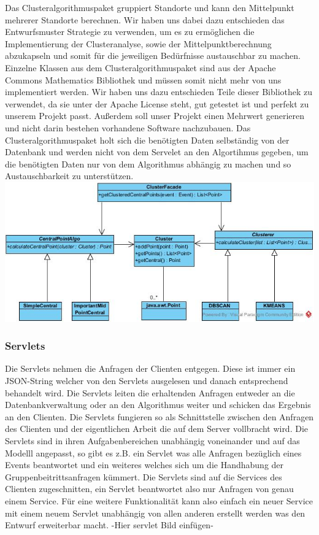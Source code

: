 Das Clusteralgorithmuspaket gruppiert Standorte und kann den Mittelpunkt mehrerer Standorte berechnen. Wir haben uns dabei dazu entschieden das Entwurfsmuster Strategie zu verwenden, um es zu ermöglichen die Implementierung der Clusteranalyse, sowie der Mittelpunktberechnung abzukapseln und somit für die jeweiligen Bedürfnisse austauschbar zu machen. Einzelne Klassen aus dem Clusteralgorithmuspaket sind aus der Apache Commons Mathematics Bibliothek und müssen somit nicht mehr von uns implementiert werden. Wir haben uns dazu entschieden Teile dieser Bibliothek zu verwendet, da sie unter der Apache License steht, gut getestet ist und perfekt zu unserem Projekt passt. Außerdem soll unser Projekt einen Mehrwert generieren und nicht darin bestehen vorhandene Software nachzubauen. Das Clusteralgorithmuspaket holt sich die benötigten Daten selbständig von der Datenbank und werden nicht von dem Servelet an den Algortihmus gegeben, um die benötigten Daten nur von dem Algorithmus abhängig zu machen und so Austauschbarkeit zu unterstützen. 
  \newline
	\includegraphics[width=1\textwidth]{AlgorithmClassDiagram.jpg}

	\subsubsection{Servlets}
	Die Servlets nehmen die Anfragen der Clienten entgegen. Diese ist immer ein JSON-String welcher von den Servlets ausgelesen und danach entsprechend behandelt wird. Die Servlets leiten die erhaltenden Anfragen entweder an die Datenbankverwaltung oder an den Algorithmus weiter und schicken das Ergebnis an den Clienten.
Die Servlets fungieren so als Schnittstelle zwischen den Anfragen des Clienten und der eigentlichen Arbeit die auf dem Server vollbracht wird. 
Die Servlets sind in ihren Aufgabenbereichen unabhängig voneinander und auf das Modelll angepasst, so gibt es z.B. ein Servlet was alle Anfragen bezüglich eines Events beantwortet und ein weiteres welches sich um die Handhabung der Gruppenbeitrittsanfragen kümmert.
Die Servlets sind auf die Services des Clienten zugeschnitten, ein Servlet beantwortet also nur Anfragen von genau einem Service.
Für eine weitere Funktionalität kann also einfach ein neuer Service mit einem neuem Servlet unabhängig von allen anderen erstellt werden was den Entwurf erweiterbar macht.   
-Hier servlet Bild einfügen-

